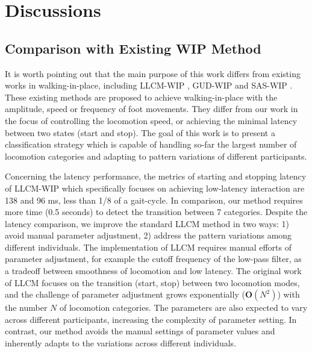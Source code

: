 \documentclass[review]{vgtc}                 %
\begin{document}
\section{Discussions}
\label{sec:discussions}
\subsection{Comparison with Existing WIP Method}
\label{sec:compare_wip}

It is worth pointing out that the main purpose of this work differs from existing works in walking-in-place, including LLCM-WIP \cite{feasel2008llcm}, GUD-WIP \cite{wendt2010gud} and SAS-WIP \cite{bruno2013new}.
These existing methods are proposed to achieve walking-in-place with the amplitude, speed or frequency of foot movements.
They differ from our work in the focus of controlling the locomotion speed, or achieving the minimal latency between two states (start and stop). 
The goal of this work is to present a classification strategy which is capable of handling so-far the largest number of locomotion categories and adapting to pattern variations of different participants.

Concerning the latency performance, the metrics of starting and stopping latency of  LLCM-WIP \cite{feasel2008llcm} which specifically focuses on achieving low-latency interaction are 138 and 96 ms, less than 1/8 of a gait-cycle.
In comparison, our method requires more time (0.5 seconds) to detect the transition between 7 categories.
Despite the latency comparison, we improve the standard LLCM method in two ways: 1) avoid manual parameter adjustment, 2) address the pattern variations among different individuals.
The implementation of LLCM requires manual efforts of parameter adjustment, for example the cutoff frequency of the low-pass filter, as a tradeoff between smoothness of
locomotion and low latency.
The original work of LLCM focuses on the transition (start, stop) between two locomotion modes, and the challenge of parameter adjustment grows exponentially ($\mathbf{O}(N^2)$) with the number $N$ of locomotion categories.
The parameters are also expected to vary across different participants, increasing the complexity of parameter setting.
In contrast, our method avoids the manual settings of parameter values and inherently adapts to the variations across different individuals.
\end{document}
